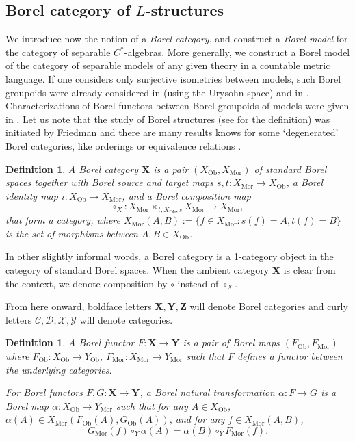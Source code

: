 \documentclass[12pt]{amsart}
\newtheorem{definition}[theorem]{Definition}
\DeclareMathOperator{\Mor}{Mor}
\DeclareMathOperator{\Ob}{Ob}
\begin{document}
\subsection{Borel category of $L$-structures}\label{subsection: Borel categories}

We introduce now the notion of a \emph{Borel category}, and construct a \emph{Borel model} for the category of separable $C^*$-algebras. 
More generally, we construct a Borel model of the category of separable models of any given theory in a countable metric language. 
If one considers only surjective isometries between models, such Borel groupoids were already considered in \cite{ElliottEtAl2013, MR3660238} (using the Urysohn space) and in \cite{yaacov2017metric}. Characterizations of Borel functors between Borel groupoids of models were given in \cite{MR3893282, MR4029718}. Let us note that the study of Borel structures (see \cite{steinhorn1985chapter, MR2830412} for the definition) was initiated by Friedman \cite{friedman1979borel} and there are many results knows for some `degenerated' Borel categories, like orderings or equivalence relations \cite{MR965754, MR1057041}.

\begin{definition} \label{def: Borel category}
    A Borel category $\mathbf{X}$ is a pair $(X_{\Ob},X_{\Mor})$ of standard Borel spaces together with Borel source and target maps $s,t \colon X_{\Mor} \to X_{\Ob}$, a Borel identity map $i \colon X_{\Ob} \to X_{\Mor}$, and a Borel composition map
    \[ \circ_X \colon X_{\Mor} \times_{t, X_{\Ob},s} X_{\Mor} \to X_{\Mor}, \]
    that form a category, where $X_{\Mor}(A,B) := \{ f \in X_{\Mor} \colon s(f)=A, t(f)=B \}$ is the set of morphisms between $A,B \in X_{\Ob}$. 
\end{definition}

In other slightly informal words, a Borel category is a 1-category object in the category of standard Borel spaces. When the ambient category $\mathbf{X}$ is clear from the context, we denote composition by $\circ$ instead of $\circ_{{X}}$.

From here onward, boldface letters $\mathbf{X},\mathbf{Y},\mathbf{Z}$ will denote Borel categories and curly letters $\mathcal{C},\mathcal{D},\mathcal{X},\mathcal{Y}$ will denote categories.

\begin{definition}
    A Borel functor $F \colon \mathbf{X}\to\mathbf{Y}$ is a pair of Borel maps $(F_{\Ob},F_{\Mor})$ where $F_{\Ob} \colon X_{\Ob} \to Y_{\Ob}$, $F_{\Mor} \colon X_{\Mor} \to Y_{\Mor}$ such that $F$ defines a functor between the underlying categories.

    For Borel functors $F,G \colon \mathbf{X}\to\mathbf{Y}$, a Borel natural transformation $\alpha \colon F\to G$ is a Borel map $\alpha \colon X_{\Ob} \to Y_{\Mor}$ such that for any $A\in X_{\Ob}$, $\alpha(A)\in X_{\Mor}(F_{\Ob}(A),G_{\Ob}(A))$, and for any $f\in X_{\Mor}(A,B)$,
    \[ G_{\Mor}(f) \circ_{Y} \alpha(A) = \alpha(B) \circ_{Y} F_{\Mor}(f).\]
\end{definition}
\end{document}
